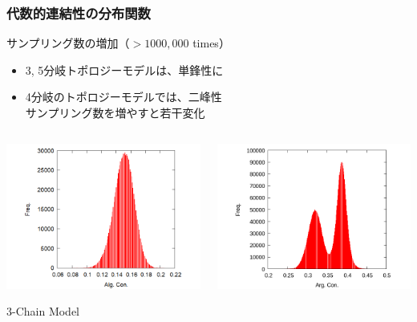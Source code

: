 \documentclass[12pt, dvipdfmx]{beamer}
\begin{document}
\begin{frame}
	\frametitle{代数的連結性の分布関数}
		\begin{exampleblock}{サンプリング数の増加（$> 1000,000$ times）}
			\begin{itemize}
				\item 3, 5分岐トポロジーモデルは、単鋒性に
				\item 4分岐のトポロジーモデルでは、二峰性\\
				サンプリング数を増やすと若干変化
			\end{itemize}
		\end{exampleblock}
		\begin{columns}[totalwidth=1\textwidth]
				\begin{center}
					\includegraphics[width=1.2\columnwidth]{3.png}

					3-Chain Model
				\end{center}
				\begin{center}
					\includegraphics[width=1.2\columnwidth]{4_1000_5000.png}


\end{center}
\end{columns}
\end{frame}
\end{document}
